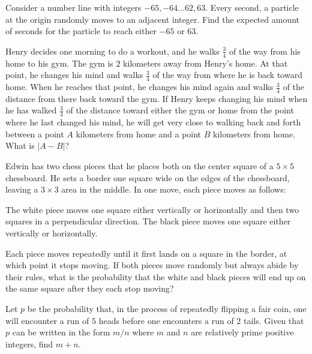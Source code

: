 \documentclass[mast]{lucky}
\begin{document}
\begin{req}[ART 2019/4]{4}
 Consider a number line with integers $-65,-64\dots 62,63.$ Every second, a particle at the origin randomly moves to an adjacent integer. Find the expected amount of seconds for the particle to reach either $-65$ or $63.$
\end{req}

\begin{prob}[AMC 10B 2019/18]{4}
Henry decides one morning to do a workout, and he walks $\tfrac{3}{4}$ of the way from his home to his gym. The gym is $2$ kilometers away from Henry's home. At that point, he changes his mind and walks $\tfrac{3}{4}$ of the way from where he is back toward home. When he reaches that point, he changes his mind again and walks $\tfrac{3}{4}$ of the distance from there back toward the gym. If Henry keeps changing his mind when he has walked $\tfrac{3}{4}$ of the distance toward either the gym or home from the point where he last changed his mind, he will get very close to walking back and forth between a point $A$ kilometers from home and a point $B$ kilometers from home. What is $|A-B|$?
\end{prob}

\begin{prob}[TMC 2020 10B/18]{4}
 Edwin has two chess pieces that he places both on the center square of a $5\times 5$ chessboard. He sets a border one square wide on the edges of the chessboard, leaving a $3\times 3$ area in the middle. In one move, each piece moves as follows:
    \begin{itemize}
\Item The white piece moves one square either vertically or horizontally and then two squares in a perpendicular direction.
\Item The black piece moves one square either vertically or horizontally.
\end{itemize}
Each piece moves repeatedly until it first lands on a square in the border, at which point it stops moving. If both pieces move randomly but always abide by their rules, what is the probability that the white and black pieces will end up on the same square after they each stop moving?
\end{prob}   

\begin{prob}[AIME 1995/15]{4}
 Let $p$ be the probability that, in the process of repeatedly flipping a fair coin, one will encounter a run of $5$ heads before one encounters a run of $2$ tails. Given that $p$ can be written in the form $m/n$ where $m$ and $n$ are relatively prime positive integers, find $m+n$.
\end{prob}
\end{document}
